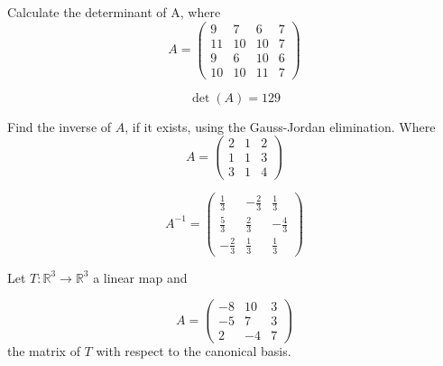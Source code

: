 \begin{questions}

\question Calculate the determinant of A, where
$$
A=\left(\begin{array}{rrrr}
9 & 7 & 6 & 7 \\
11 & 10 & 10 & 7 \\
9 & 6 & 10 & 6 \\
10 & 10 & 11 & 7
\end{array}\right)
$$

\begin{solution}
$$\det(A)=129$$
\end{solution}

\question Find the inverse of $A$, if it exists, using the Gauss-Jordan elimination. Where
$$
A=\left(\begin{array}{rrr}
2 & 1 & 2 \\
1 & 1 & 3 \\
3 & 1 & 4
\end{array}\right)
$$

\begin{solution}
$$A^{-1}=\left(\begin{array}{rrr}
\frac{1}{3} & -\frac{2}{3} & \frac{1}{3} \\
\frac{5}{3} & \frac{2}{3} & -\frac{4}{3} \\
-\frac{2}{3} & \frac{1}{3} & \frac{1}{3}
\end{array}\right)$$
\end{solution}

\question Let $T:\mathbb{R}^3\rightarrow\mathbb{R}^3$  a linear map and
 
$$
A=\left(\begin{array}{rrr}
-8 & 10 & 3 \\
-5 & 7 & 3 \\
2 & -4 & 7
\end{array}\right)
$$
the matrix of $T$ with respect to the canonical basis.
\end{questions}

